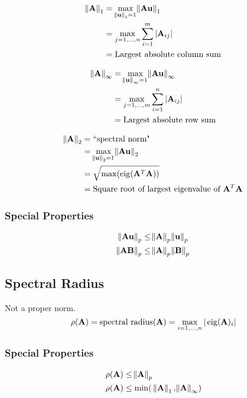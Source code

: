 \begin{align}
\norm{\mathbf{A}}_1
  &=\max_{\norm{\mathbf{u}}_1=1} \norm{\mathbf{A}\mathbf{u}}_1       \\
  &=\max_{j=1,\ldots,n} \sum_{i=1}^m |\mathbf{A}_{ij}| \\
  &=\textrm{Largest absolute column sum}
\end{align}

\begin{align}
\norm{\mathbf{A}}_\infty
  &=\max_{\norm{\mathbf{u}}_\infty=1} \norm{\mathbf{A}\mathbf{u}}_\infty  \\
  &=\max_{j=1,\ldots,m} \sum_{i=1}^n |\mathbf{A}_{ij}| \\
  &=\textrm{Largest absolute row sum}
\end{align}

\begin{align}
\norm{\mathbf{A}}_2
  &=\textrm{``spectral norm"}                   \\
  &=\max_{\norm{\mathbf{u}}_2=1} \norm{\mathbf{A}\mathbf{u}}_2       \\
  &=\sqrt{\max(\operatorname{eig}(\mathbf{A}^T\mathbf{A}))} \\
  &=\textrm{Square root of largest eigenvalue of~}\mathbf{A}^T\mathbf{A}
\end{align}



\subsubsection{Special Properties}
\begin{align}
\norm{\mathbf{A}\mathbf{u}}_p &\le \norm{\mathbf{A}}_p \norm{\mathbf{u}}_p \\
\norm{\mathbf{A}\mathbf{B}}_p &\le \norm{\mathbf{A}}_p \norm{\mathbf{B}}_p \\
\end{align}

\subsection{Spectral Radius}
Not a proper norm.
\begin{equation}
\rho(\mathbf{A})=\textrm{spectral radius}(\mathbf{A})=\max_{i=1,\ldots,n} | \operatorname{eig}(\mathbf{A})_i |
\end{equation}

\subsubsection{Special Properties}
\begin{align}
\rho(\mathbf{A}) &\le \norm{\mathbf{A}}_p \\
\rho(\mathbf{A}) &\le \min(~\norm{\mathbf{A}}_1, \norm{\mathbf{A}}_\infty) \\
\end{align}


